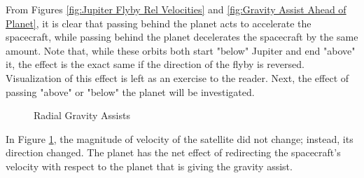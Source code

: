 \documentclass[../main.tex]{subfiles}
\begin{document}
From Figures \ref{fig:Jupiter Flyby Rel Velocities} and \ref{fig:Gravity Assist Ahead of Planet}, it is clear that passing behind the planet acts to accelerate the spacecraft, while passing behind the planet decelerates the spacecraft by the same amount. Note that, while these orbits both start "below" Jupiter and end "above" it, the effect is the exact same if the direction of the flyby is reversed. Visualization of this effect is left as an exercise to the reader. Next, the effect of passing "above" or "below" the planet will be investigated.

\begin{figure}[H]
    \centering
    \caption{Radial Gravity Assists}\label{fig:Gravity assists above/below}
\end{figure}

In Figure \ref{fig:Gravity assists above/below}, the magnitude of velocity of the satellite did not change; instead, its direction changed. The planet has the net effect of redirecting the spacecraft's velocity with respect to the planet that is giving the gravity assist.
\end{document}
